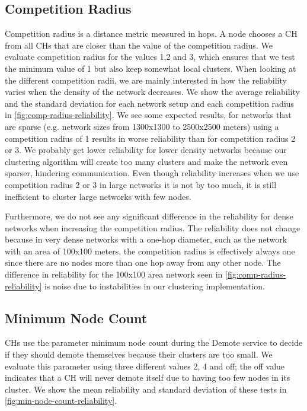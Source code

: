 \subsection{Competition Radius}
Competition radius is a distance metric measured in hops. A node chooses a CH from all CHs that are closer than the value of the competition radius. We evaluate competition radius for the values 1,2 and 3, which ensures that we test the minimum value of 1 but also keep somewhat local clusters. When looking at the different competition radii, we are mainly interested in how the reliability varies when the density of the network decreases. We show the average reliability and the standard deviation for each network setup and each competition radius in \cref{fig:comp-radius-reliability}. We see some expected results, for networks that are sparse (e.g. network sizes from 1300x1300 to 2500x2500 meters) using a competition radius of 1 results in worse reliability than for competition radius 2 or 3. We probably get lower reliability for lower density networks because our clustering algorithm will create too many clusters and make the network even sparser, hindering communication. Even though reliability increases when we use competition radius 2 or 3 in large networks it is not by too much, it is still inefficient to cluster large networks with few nodes. 

Furthermore, we do not see any significant difference in the reliability for dense networks when increasing the competition radius. The reliability does not change because in very dense networks with a one-hop diameter, such as the network with an area of 100x100 meters, the competition radius is effectively always one since there are no nodes more than one hop away from any other node. The difference in reliability for the 100x100 area network seen in \cref{fig:comp-radius-reliability} is noise due to instabilities in our clustering implementation.

\subsection{Minimum Node Count}
CHs use the parameter minimum node count during the Demote service to decide if they should demote themselves because their clusters are too small. We evaluate this parameter using three different values 2, 4 and off; the off value indicates that a CH will never demote itself due to having too few nodes in its cluster. We show the mean reliability and standard deviation of these tests in \cref{fig:min-node-count-reliability}.

